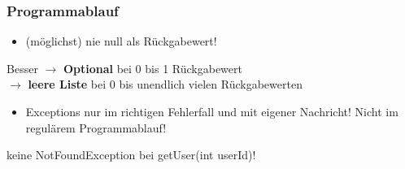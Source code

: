 \begin{frame}
\frametitle{Programmablauf}
  \begin{itemize}
    \item (möglichst) nie null als Rückgabewert!
  \end{itemize}
  \begin{block}{Besser}
    $\rightarrow$ \textbf{Optional} bei 0 bis 1 Rückgabewert\\
    $\rightarrow$ \textbf{leere Liste} bei 0 bis unendlich vielen Rückgabewerten\\
  \end{block}
  \begin{itemize}
    \item Exceptions nur im richtigen Fehlerfall und mit eigener Nachricht! Nicht im regulärem Programmablauf!
    \end{itemize}
  \begin{Beispiel}
  \par keine NotFoundException bei getUser(int userId)!
  \end{Beispiel}

\end{frame}
